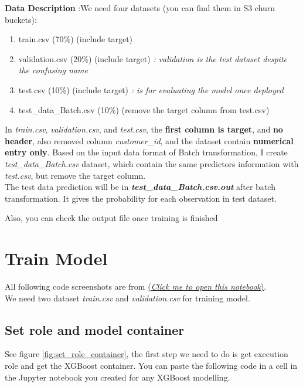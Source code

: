 \documentclass[12pt]{article}
\begin{document}
\noindent
\textbf{Data Description} :We need four datasets (you can find them in S3 churn buckets):
\begin{enumerate}
\item train.csv (70\%) (include target) 

\item validation.csv (20\%) (include target) \textit{: validation is the test dataset despite the confusing name}

\item test.csv (10\%) (include target) \textit{: is for evaluating the model once deployed} 

\item test\_data\_Batch.csv (10\%) (remove the target column from test.csv) 
\end{enumerate} 


\noindent
In \textit{train.csv}, \textit{validation.csv}, and \textit{test.csv}, the \textbf{first column is target}, and \textbf{no header}, also removed column \textit{customer\_id}, and the dataset contain \textbf{numerical entry only}. Based on the input data format of Batch transformation, I create \textit{test\_data\_Batch.csv} dataset, which contain the same predictors information with \textit{test.csv}, but remove the target column.
\\

\noindent
The test data prediction will be in \textbf{\textit{test\_data\_Batch.csv.out}} after batch transformation. It gives the probability for each observation in test dataset. 

\noindent
Also, you can check the output file once training is finished 


\newpage
\section{Train Model}
All following code screenshots are from \href{https://github.com/YiranJing/BigDataAnalysis/blob/master/AWS_SageMaker_CustomerChurn/notebook/AmazonSageMaker/AWS_BUILTIN_MODEL_DEPLOYMENT.ipynb}{(\textit{Click me to open this notebook})}.
\\

\noindent
We need two dataset \textit{train.csv} and \textit{validation.csv} for training model.

\subsection{Set role and model container}
See figure \ref{fig:set_role_container}, the first step we need to do is get execution role and get the XGBoost container. You can paste the following code in a cell in the Jupyter notebook you created for any XGBoost modelling.
\end{document}
